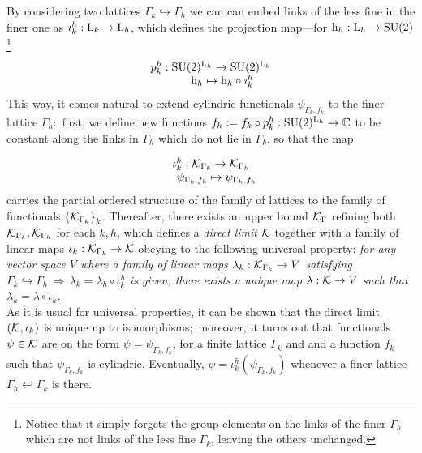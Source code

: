 By considering two lattices $\Gamma_k\hookrightarrow\Gamma_h$ we can can embed links of the less fine in the finer one as $\imath_k^h:\text{\normalfont L}_k\to\text{\normalfont L}_h$, which defines the projection map---for $\text{\normalfont h}_h:\text{\normalfont L}_h\to\text{\normalfont SU}(2)$\footnote{Notice that it simply forgets the group elements on the links of the finer $\Gamma_h$ which are not links of the less fine $\Gamma_k$, leaving
the others unchanged.}
$$\begin{matrix}
    p_k^h:\text{\normalfont SU}(2)^{\text{\normalfont L}_h}\to\text{\normalfont SU}(2)^{\text{\normalfont L}_k}\\
    \qquad\text{\normalfont h}_h\mapsto\text{\normalfont h}_h\circ\imath_k^h
\end{matrix}$$
This way, it comes natural to extend cylindric functionals $\psi_{\Gamma_k,f_k}$ to the finer lattice $\Gamma_h$:\, first, we define new functions $f_h:=f_k\circ p^h_k:\text{\normalfont SU}(2)^{\text{\normalfont L}_h}\to\mathbb{C}$ to be constant along the links in $\Gamma_h$ which do not lie in $\Gamma_k$, so that the map

$$\begin{matrix}
    \iota_k^h:\mathcal{K}_{\Gamma_k}\to\mathcal{K}_{\Gamma_h}\\
    \quad\psi_{\Gamma_k,f_k}\mapsto\psi_{\Gamma_h,f_h}
\end{matrix}$$
carries the partial ordered structure of the family of lattices to the family of functionals ${\{\mathcal{K}_{\Gamma_k}\}}_k$. Thereafter, there exists an upper bound $\mathcal{K}_\Gamma$ refining both $\mathcal{K}_{\Gamma_k},\mathcal{K}_{\Gamma_h}$ for each $k,h$, which defines a \emph{direct limit} $\mathcal{K}$ together with a family of linear maps $\iota_k:\mathcal{K}_{\Gamma_k}\to\mathcal{K}$ obeying to the following universal property: \emph{for any vector space $V$ where a family of linear maps $\lambda_k:\mathcal{K}_{\Gamma_k}\to V$ satisfying $\Gamma_k\hookrightarrow\Gamma_h\,\Rightarrow\,\lambda_k=\lambda_h\circ\iota_k^h$ is given, there exists a unique map $\lambda:\mathcal{K}\to V$ such that $\lambda_k=\lambda\circ\iota_k$.}\\

    As it is usual for universal properties, it can be shown that the direct limit $(\mathcal{K},\iota_k)$ is unique up to isomorphisms;\, moreover, it turns out that functionals $\psi\in\mathcal{K}$ are on the form $\psi=\psi_{\Gamma_k,f_k}$, for a finite lattice $\Gamma_k$ and and a function $f_k$ such that $\psi_{\Gamma_k,f_k}$ is cylindric. Eventually, $\psi=\iota^h_k(\psi_{\Gamma_k,f_k})$ whenever a finer lattice $\Gamma_h\hookleftarrow\Gamma_k$ is there.%

